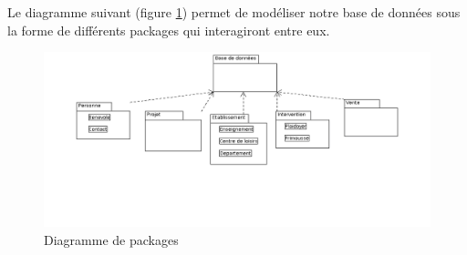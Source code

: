 Le diagramme suivant (figure \ref{diagramme_package}) permet de modéliser notre base de données sous la forme de différents packages qui interagiront entre eux.
\begin{figure}[H]
	\centering
	\includegraphics[scale=0.3]{diagrammePackage/images/diagrammePackage}
	\caption{Diagramme de packages}
	\label{diagramme_package}	
\end{figure}	